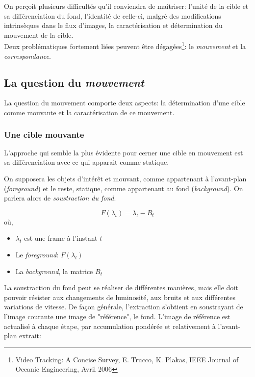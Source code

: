 \documentclass[a4paper,12pt]{report}
\begin{document}
On perçoit plusieurs difficultés qu'il conviendra de maîtriser: l'unité de la cible et sa différenciation du fond, l'identité de celle-ci, malgré des modifications intrinsèques dans le flux d'images, la caractérisation et détermination du mouvement de la cible.\\
Deux problématiques fortement liées peuvent être dégagées\footnote{Video Tracking: A Concise Survey, E. Trucco, K. Plakas, IEEE Journal of Oceanic Engineering, Avril 2006}: le \textit{mouvement} et la \textit{correspondance}.

\subsection{La question du \textit{mouvement}}

	La question du mouvement comporte deux aspects: la détermination d'une cible comme mouvante et la caractérisation de ce mouvement.\\	
	
\subsubsection{Une cible mouvante}	
	L'approche qui semble la plus évidente pour cerner une cible en mouvement est sa différenciation avec ce qui apparait comme statique. 
	
	On supposera les objets d'intérêt et mouvant, comme appartenant à l'avant-plan (\textit{foreground}) et le reste, statique, comme appartenant au fond (\textit{background}). On parlera alors de \textit{soustraction du fond}.

\[F(\lambda_t) = \lambda_t - B_t\]	
où,
\begin{itemize}
\item[] $\lambda_t$ est une frame à l'instant $t$
\item[] Le \textit{foreground}: $F(\lambda_t)$ 
\item[] La \textit{background}, la matrice $B_t$\\
\end{itemize}

	La soustraction du fond peut se réaliser de différentes manières, mais elle doit pouvoir résister aux changements de luminosité, aux bruits et aux différentes variations de vitesse.
	De façon générale, l'extraction s'obtient en soustrayant de l'image courante une image de "référence", le fond.
	L'image de référence est actualisé à chaque étape, par accumulation pondérée et relativement à l'avant-plan extrait:
	
\end{document}

